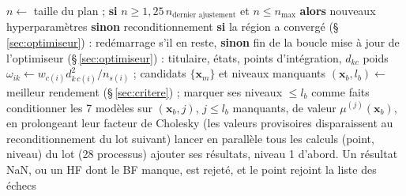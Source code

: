 \documentclass[10pt,a4paper]{article}
\newcommand{\vx}{\bm{x}}
\begin{document}
\begin{algorithm}[h]
\caption{Un lot ()}
\begin{algorithmic}[1]
\State $n\gets$ taille du plan ; \textbf{si} $n\ge1{,}25\,n_{\text{dernier ajustement}}$ et $n\le n_{\max}$ \textbf{alors} nouveaux hyperparamètres \textbf{sinon} reconditionnement
\State \textbf{si} la région a convergé (§\,\ref{sec:optimiseur}) : redémarrage s'il en reste, \textbf{sinon} fin de la boucle
\State mise à jour de l'optimiseur (§\,\ref{sec:optimiseur}) : titulaire, états, points d'intégration, $d_{kc}$
\State poids $\omega_{ik}\gets w_{c(i)}d_{k\,c(i)}^2/n_{s(i)}$ ; candidats $\{\vx_m\}$ et niveaux manquants
  \State $(\vx_b,l_b)\gets$ meilleur rendement (§\,\ref{sec:critere}) ; marquer ses niveaux $\le l_b$ comme faits
     \State conditionner les 7 modèles sur $(\vx_b,j)$, $j\le l_b$ manquants, de valeur $\mu^{(j)}(\vx_b)$, en prolongeant leur facteur de Cholesky
  \EndIf
\EndFor
\State (les valeurs provisoires disparaissent au reconditionnement du lot suivant)
\State lancer en parallèle tous les calculs (point, niveau) du lot (28 processus)
   \State ajouter ses résultats, niveau 1 d'abord. Un résultat NaN, ou un HF dont le BF manque, est rejeté, et le point rejoint la liste des échecs
\EndFor
\end{algorithmic}
\end{algorithm}

\end{document}

